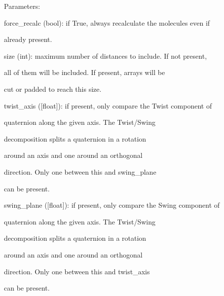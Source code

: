 \documentclass[letterpaper,10pt,english]{sphinxmanual}
\begin{document}
\begin{fulllineitems}
\begin{DUlineblock}{0em}
\item[] Parameters:
\item[]
\begin{DUlineblock}{\DUlineblockindent}
\item[] force\_recalc (bool): if True, always recalculate the molecules even if
\item[]
\begin{DUlineblock}{\DUlineblockindent}
\item[] already present.
\end{DUlineblock}
\item[] size (int): maximum number of distances to include. If not present,
\item[]
\begin{DUlineblock}{\DUlineblockindent}
\item[] all of them will be included. If present, arrays will be
\item[] cut or padded to reach this size.
\end{DUlineblock}
\item[] twist\_axis ({[}float{]}): if present, only compare the Twist component of
\item[]
\begin{DUlineblock}{\DUlineblockindent}
\item[] quaternion along the given axis. The Twist/Swing
\item[] decomposition splits a quaternion in a rotation
\item[] around an axis and one around an orthogonal
\item[] direction. Only one between this and swing\_plane
\item[] can be present.
\end{DUlineblock}
\item[] swing\_plane ({[}float{]}): if present, only compare the Swing component of
\item[]
\begin{DUlineblock}{\DUlineblockindent}
\item[] quaternion along the given axis. The Twist/Swing
\item[] decomposition splits a quaternion in a rotation
\item[] around an axis and one around an orthogonal
\item[] direction. Only one between this and twist\_axis
\item[] can be present.
\end{DUlineblock}
\end{DUlineblock}
\end{DUlineblock}


\end{fulllineitems}
\end{document}
